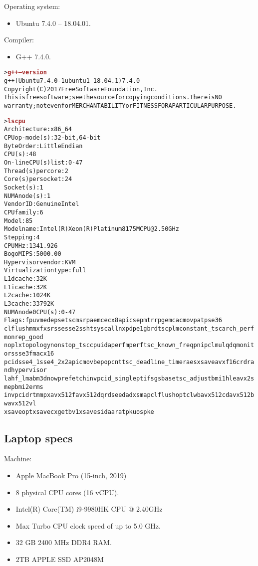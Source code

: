 \documentclass[10pt]{article}
\begin{document}
Operating system:
\begin{itemize}
\item Ubuntu 7.4.0 -- 18.04.01.
\end{itemize}

Compiler:
\begin{itemize}
\item G++ 7.4.0.
\end{itemize}

\begin{alltt}
\footnotesize
> \textbf{\textcolor{brown}{g++ --version}}
g++ (Ubuntu 7.4.0-1ubuntu1~18.04.1) 7.4.0
Copyright (C) 2017 Free Software Foundation, Inc.
This is free software; see the source for copying conditions.  There is NO
warranty; not even for MERCHANTABILITY or FITNESS FOR A PARTICULAR PURPOSE.


> \textbf{\textcolor{brown}{lscpu}}
Architecture:        x86_64
CPU op-mode(s):      32-bit, 64-bit
Byte Order:          Little Endian
CPU(s):              48
On-line CPU(s) list: 0-47
Thread(s) per core:  2
Core(s) per socket:  24
Socket(s):           1
NUMA node(s):        1
Vendor ID:           GenuineIntel
CPU family:          6
Model:               85
Model name:          Intel(R) Xeon(R) Platinum 8175M CPU @ 2.50GHz
Stepping:            4
CPU MHz:             1341.926
BogoMIPS:            5000.00
Hypervisor vendor:   KVM
Virtualization type: full
L1d cache:           32K
L1i cache:           32K
L2 cache:            1024K
L3 cache:            33792K
NUMA node0 CPU(s):   0-47
Flags:               fpu vme de pse tsc msr pae mce cx8 apic sep mtrr pge mca cmov pat pse36
clflush mmx fxsr sse sse2 ss ht syscall nx pdpe1gb rdtscp lm constant_tsc arch_perfmon rep_good
nopl xtopology nonstop_tsc cpuid aperfmperf tsc_known_freq pni pclmulqdq monitor ssse3 fma cx16
pcid sse4_1 sse4_2 x2apic movbe popcnt tsc_deadline_timer aes xsave avx f16c rdrand hypervisor
lahf_lm abm 3dnowprefetch invpcid_single pti fsgsbase tsc_adjust bmi1 hle avx2 smep bmi2 erms
invpcid rtm mpx avx512f avx512dq rdseed adx smap clflushopt clwb avx512cd avx512bw avx512vl
xsaveopt xsavec xgetbv1 xsaves ida arat pku ospke
\end{alltt}

\subsection{Laptop specs}


Machine:
\begin{itemize}
\item Apple MacBook Pro (15-inch, 2019)
\item 8 physical CPU cores (16 vCPU).
\item Intel(R) Core(TM) i9-9980HK CPU @ 2.40GHz
\item Max Turbo CPU clock speed of up to 5.0 GHz.
\item 32 GB 2400 MHz DDR4 RAM.
\item 2TB APPLE SSD AP2048M
\end{itemize}
\end{document}
